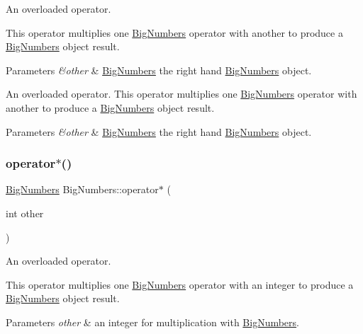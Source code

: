 An overloaded operator. 

This operator multiplies one \mbox{\hyperlink{class_big_numbers}{Big\+Numbers}} operator with another to produce a \mbox{\hyperlink{class_big_numbers}{Big\+Numbers}} object result. 
\begin{DoxyParams}{Parameters}
{\em \&other} & \mbox{\hyperlink{class_big_numbers}{Big\+Numbers}} the right hand \mbox{\hyperlink{class_big_numbers}{Big\+Numbers}} object.\\
\hline
\end{DoxyParams}
An overloaded operator. This operator multiplies one \mbox{\hyperlink{class_big_numbers}{Big\+Numbers}} operator with another to produce a \mbox{\hyperlink{class_big_numbers}{Big\+Numbers}} object result. 
\begin{DoxyParams}{Parameters}
{\em \&other} & \mbox{\hyperlink{class_big_numbers}{Big\+Numbers}} the right hand \mbox{\hyperlink{class_big_numbers}{Big\+Numbers}} object. \\
\hline
\end{DoxyParams}
\mbox{\label{class_big_numbers_a67e09d8ec4ff009ced71beb3a1c3629a}} 
\subsubsection{\texorpdfstring{operator$\ast$()}{operator*()}\hspace{0.1cm}{\footnotesize\ttfamily [2/2]}}
{\footnotesize\ttfamily \mbox{\hyperlink{class_big_numbers}{Big\+Numbers}} Big\+Numbers\+::operator$\ast$ (\begin{DoxyParamCaption}\item[{int}]{other }\end{DoxyParamCaption})}



An overloaded operator. 

This operator multiplies one \mbox{\hyperlink{class_big_numbers}{Big\+Numbers}} operator with an integer to produce a \mbox{\hyperlink{class_big_numbers}{Big\+Numbers}} object result. 
\begin{DoxyParams}{Parameters}
{\em other} & an integer for multiplication with \mbox{\hyperlink{class_big_numbers}{Big\+Numbers}}. \\
\hline
\end{DoxyParams}
\mbox{\label{class_big_numbers_a8d4f622ba90fbad6d41392caad0f83b5}} 
